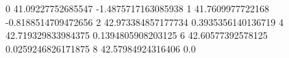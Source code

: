 0 41.09227752685547 -1.4875717163085938
1 41.7609977722168 -0.8188514709472656
2 42.973384857177734 0.3935356140136719
4 42.719329833984375 0.1394805908203125
6 42.60577392578125 0.0259246826171875
8 42.57984924316406 0.0
